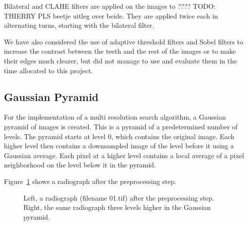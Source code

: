 \documentclass[a4paper]{article}
\begin{document}
Bilateral and CLAHE filters are applied on the images to ???? TODO: THIERRY PLS beetje uitleg over beide.
They are applied twice each in alternating turns, starting with the bilateral filter.

We have also considered the use of adaptive threshold filters and Sobel filters to increase the contrast between the teeth and the rest of the images or to make their edges much clearer, but did not manage to use and evaluate them in the time allocated to this project.

\subsection{Gaussian Pyramid}
\label{subsect:gaussian-pyramid}
For the implementation of a multi resolution search algorithm, a Gaussian pyramid of images is created.
This is a pyramid of a predetermined number of levels.
The pyramid starts at level 0, which contains the original image.
Each higher level then contains a downsampled image of the level before it using a Gaussian average.
Each pixel at a higher level contains a local average of a pixel neighborhood on the level below it in the pyramid.


Figure~\ref{fig:preprocessing} shows a radiograph after the preprocessing step.
\begin{figure}[!tbp]
    \centering
    \qquad
    \caption{Left, a radiograph (filename 01.tif) after the preprocessing step. Right, the same radiograph three levels higher in the Gaussian pyramid.}
  \label{fig:preprocessing}
\end{figure}
\end{document}
